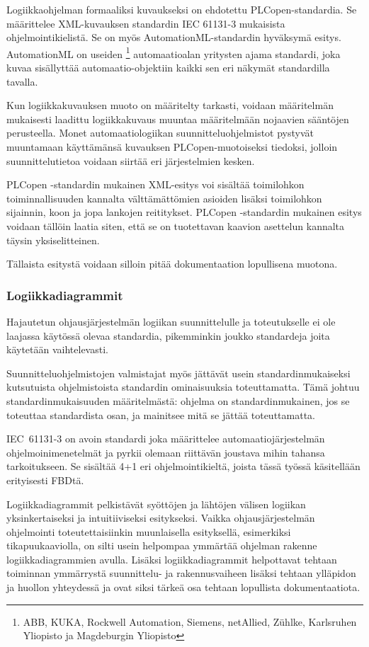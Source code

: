 \documentclass[finnish,12pt]{article}
\begin{document}
Logiikkaohjelman formaaliksi kuvaukseksi on ehdotettu PLCopen-standardia.
Se määrittelee XML-kuvauksen standardin IEC 61131-3 mukaisista ohjelmointikielistä.
Se on myös AutomationML-standardin hyväksymä esitys.
AutomationML on useiden \footnote{ABB, KUKA, Rockwell Automation, Siemens, netAllied, Zühlke, Karlsruhen Yliopisto ja Magdeburgin Yliopisto} automaatioalan yritysten ajama standardi, joka kuvaa sisällyttää automaatio-objektiin kaikki sen eri näkymät standardilla tavalla.

Kun logiikkakuvauksen muoto on määritelty tarkasti, voidaan määritelmän mukaisesti laadittu logiikkakuvaus muuntaa määritelmään nojaavien sääntöjen perusteella.
Monet automaatiologiikan suunnitteluohjelmistot pystyvät muuntamaan käyttämänsä kuvauksen PLCopen-muotoiseksi tiedoksi, jolloin suunnittelutietoa voidaan siirtää eri järjestelmien kesken.

PLCopen -standardin mukainen XML-esitys voi sisältää toimilohkon toiminnallisuuden kannalta välttämättömien asioiden lisäksi toimilohkon sijainnin, koon ja jopa lankojen reititykset.
PLCopen -standardin mukainen esitys voidaan tällöin laatia siten, että se on tuotettavan kaavion asettelun kannalta täysin yksiselitteinen.

Tällaista esitystä voidaan silloin pitää dokumentaation lopullisena muotona.


	\subsubsection{Logiikkadiagrammit}


Hajautetun ohjausjärjestelmän logiikan suunnittelulle ja toteutukselle ei ole laajassa käytössä olevaa standardia, pikemminkin joukko standardeja joita käytetään vaihtelevasti.

Suunnitteluohjelmistojen valmistajat myös jättävät usein standardinmukaiseksi kutsutuista ohjelmistoista standardin ominaisuuksia toteuttamatta.\cite{RefWorks:42}
Tämä johtuu standardinmukaisuuden määritelmästä: ohjelma on standardinmukainen, jos se toteuttaa standardista osan, ja mainitsee mitä se jättää toteuttamatta.

IEC~61131-3 on avoin standardi joka määrittelee automaatiojärjestelmän ohjelmoinimenetelmät ja
 pyrkii olemaan riittävän joustava mihin tahansa tarkoitukseen. Se sisältää 4+1 eri
ohjelmointikieltä, joista tässä työssä käsitellään erityisesti FBDtä.

Logiikkadiagrammit pelkistävät syöttöjen ja lähtöjen välisen logiikan
yksinkertaiseksi ja intuitiiviseksi esitykseksi. Vaikka ohjausjärjestelmän
ohjelmointi toteutettaisiinkin muunlaisella esityksellä, esimerkiksi
tikapuukaaviolla, on silti usein helpompaa ymmärtää ohjelman rakenne
logiikkadiagrammien avulla. Lisäksi logiikkadiagrammit helpottavat tehtaan
toiminnan ymmärrystä suunnittelu- ja rakennusvaiheen lisäksi tehtaan ylläpidon
ja huollon yhteydessä ja ovat siksi tärkeä osa tehtaan lopullista
dokumentaatiota.
\end{document}
